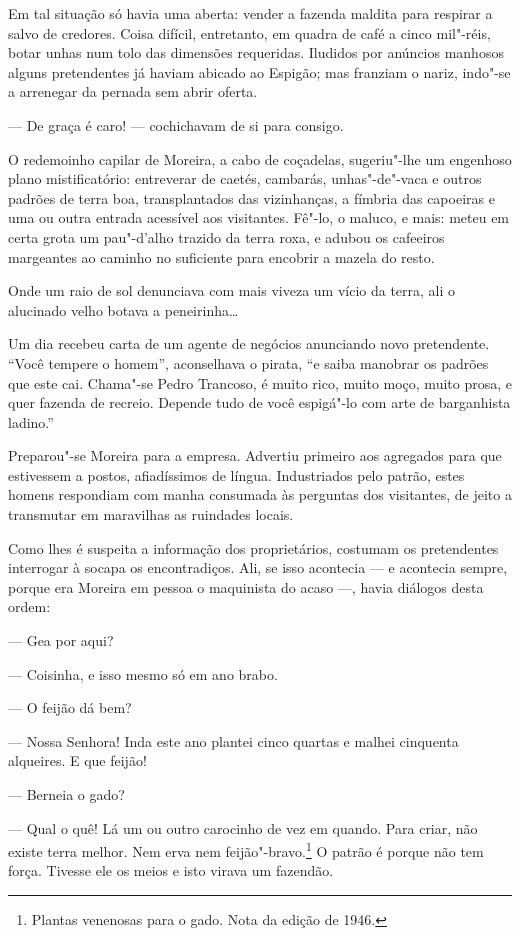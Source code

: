 Em tal situação só havia uma aberta: vender a fazenda maldita para
respirar a salvo de credores. Coisa difícil, entretanto, em quadra de
café a cinco mil"-réis, botar unhas num tolo das dimensões requeridas.
Iludidos por anúncios manhosos alguns pretendentes já haviam abicado ao
Espigão; mas franziam o nariz, indo"-se a arrenegar da pernada sem abrir
oferta.

--- De graça é caro! --- cochichavam de si para consigo.

O redemoinho capilar de Moreira, a cabo de coçadelas, sugeriu"-lhe um
engenhoso plano mistificatório: entreverar de caetés, cambarás,
unhas"-de"-vaca e outros padrões de terra boa, transplantados das
vizinhanças, a fímbria das capoeiras e uma ou outra entrada acessível
aos visitantes. Fê"-lo, o maluco, e mais: meteu em certa grota um
pau"-d'alho trazido da terra roxa, e adubou os cafeeiros margeantes ao
caminho no suficiente para encobrir a mazela do resto.

Onde um raio de sol denunciava com mais viveza um vício da terra, ali o
alucinado velho botava a peneirinha\ldots{}

Um dia recebeu carta de um agente de negócios anunciando novo
pretendente. ``Você tempere o homem'', aconselhava o pirata, ``e saiba
manobrar os padrões que este cai. Chama"-se Pedro Trancoso, é muito rico,
muito moço, muito prosa, e quer fazenda de recreio. Depende tudo de você
espigá"-lo com arte de barganhista ladino.''

Preparou"-se Moreira para a empresa. Advertiu primeiro aos agregados para
que estivessem a postos, afiadíssimos de língua. Industriados pelo
patrão, estes homens respondiam com manha consumada às perguntas dos
visitantes, de jeito a transmutar em maravilhas as ruindades locais.

Como lhes é suspeita a informação dos proprietários, costumam os
pretendentes interrogar à socapa os encontradiços. Ali, se isso
acontecia --- e acontecia sempre, porque era Moreira em pessoa o
maquinista do acaso ---, havia diálogos desta ordem:

--- Gea por aqui?

--- Coisinha, e isso mesmo só em ano brabo.

--- O feijão dá bem?

--- Nossa Senhora! Inda este ano plantei cinco quartas e malhei
cinquenta alqueires. E que feijão!

--- Berneia o gado?

--- Qual o quê! Lá um ou outro carocinho de vez em quando. Para criar,
não existe terra melhor. Nem erva nem feijão"-bravo.\footnote{Plantas
  venenosas para o gado. Nota da edição de 1946.} O patrão é porque não
tem força. Tivesse ele os meios e isto virava um fazendão.

